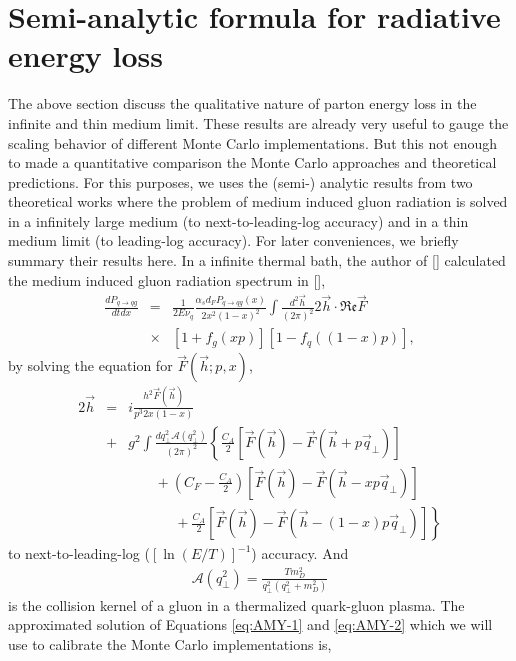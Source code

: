 \documentclass[aps, prc, reprint, amsmath, groupedaddress, nofootinbib]{revtex4-1}
\begin{document}
\section{Semi-analytic formula for radiative energy loss}\label{section:Theo}
The above section discuss the qualitative nature of parton energy loss in the infinite and thin medium limit. These results are already very useful to gauge the scaling behavior of different Monte Carlo implementations.
But this not enough to made a quantitative comparison the Monte Carlo approaches and theoretical predictions.
For this purposes, we uses the (semi-) analytic results from two theoretical works where the problem of medium induced gluon radiation is solved in a infinitely large medium (to next-to-leading-log accuracy) and in a thin medium limit (to leading-log accuracy).
For later conveniences, we briefly summary their results here.
In a infinite thermal bath, the author of [] calculated the medium induced gluon radiation spectrum in [],
\begin{eqnarray}\label{eq:AMY-1}
\nonumber
\frac{dP_{q\rightarrow qg}}{dt dx} &=& \frac{1}{2E\nu_q} \frac{\alpha_s d_F P_{q\rightarrow qg}(x)}{2x^2(1-x)^2}\int\frac{d^2\vec{h}}{(2\pi)^2}2\vec{h}\cdot \mathfrak{Re} \vec{F} \\
&\times& [1+f_g(xp)][1-f_q((1-x)p)],
\end{eqnarray}
by solving the equation for $\vec{F}(\vec{h}; p, x)$,
\begin{eqnarray}\label{eq:AMY-2}
\nonumber
2\vec{h} &=& i\frac{h^2 \vec{F}(\vec{h})}{p^3 2x(1-x)} \\
\nonumber
&+& g^2\int \frac{dq_\perp^2 \mathcal{A}(q_\perp^2)}{(2\pi)^2}\left\{\frac{C_A}{2}\left[\vec{F}(\vec{h}) - \vec{F}(\vec{h}+p\vec{q}_\perp)\right]\right. \\
\nonumber
&& \phantom{ssss} + \left(C_F - \frac{C_A}{2}\right)\left[\vec{F}(\vec{h}) - \vec{F}(\vec{h}-xp\vec{q}_\perp)\right] \\
&& \phantom{sssssss} + \left. \frac{C_A}{2}\left[\vec{F}(\vec{h}) - \vec{F}(\vec{h}-(1-x)p\vec{q}_\perp)\right] \right\}
\end{eqnarray}
to next-to-leading-log ($[\ln(E/T)]^{-1}$) accuracy.
And
\begin{eqnarray}
\mathcal{A}(q_\perp^2) = \frac{T m_D^2}{q_\perp^2(q_\perp^2+m_D^2)}
\end{eqnarray}
is the collision kernel of a gluon in a thermalized quark-gluon plasma.
The approximated solution of Equations \ref{eq:AMY-1} and \ref{eq:AMY-2} which we will use to calibrate the Monte Carlo implementations is,
\end{document}
